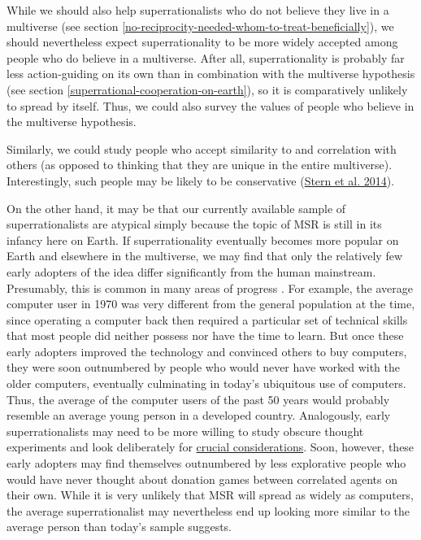 While we should also help superrationalists who do not believe they live
in a multiverse (see section
\ref{no-reciprocity-needed-whom-to-treat-beneficially}), we should nevertheless expect superrationality to be
more widely accepted among people who do believe in a multiverse. After
all, superrationality is probably far less action-guiding on its own
than in combination with the multiverse hypothesis (see section
\ref{superrational-cooperation-on-earth}), so it is comparatively unlikely to spread by
itself. Thus, we could also survey the values of people who believe in
the multiverse hypothesis.

Similarly, we could study people who accept similarity to and
correlation with others (as opposed to thinking that they are unique in
the entire multiverse). Interestingly, such people may be likely to be
conservative
(\href{http://journals.sagepub.com/doi/pdf/10.1177/0956797613500796}{Stern
et al. 2014}).

On the other hand, it may be that our currently available sample of
superrationalists are atypical simply because the topic of MSR is still
in its infancy here on Earth. If superrationality eventually becomes
more popular on Earth and elsewhere in the multiverse, we may find that
only the relatively few early adopters of the idea differ significantly
from the human mainstream. Presumably, this is common in many areas of
progress \parencite{Rogers2010-hg}. For example, the average
computer user in 1970 was very different from the general population at
the time, since operating a computer back then required a particular set
of technical skills that most people did neither possess nor have the
time to learn. But once these early adopters improved the technology and
convinced others to buy computers, they were soon outnumbered by people
who would never have worked with the older computers, eventually
culminating in today's ubiquitous use of computers. Thus, the average of
the computer users of the past 50 years would probably resemble an
average young person in a developed country. Analogously, early
superrationalists may need to be more willing to study obscure thought
experiments and look deliberately for
\href{https://concepts.effectivealtruism.org/concepts/the-importance-of-crucial-considerations/}{crucial
considerations}. Soon, however, these early adopters may find
themselves outnumbered by less explorative people who would have never
thought about donation games between correlated agents on their own.
While it is very unlikely that MSR will spread as widely as computers,
the average superrationalist may nevertheless end up looking more
similar to the average person than today's sample suggests.

